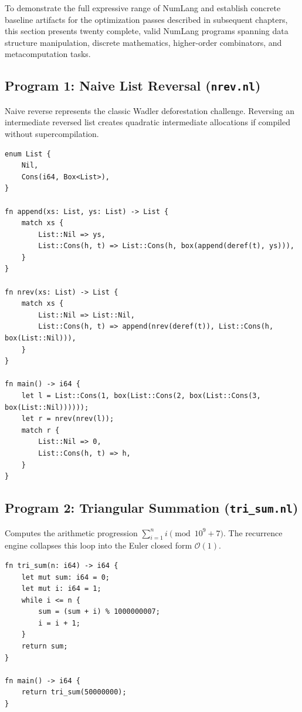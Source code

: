 To demonstrate the full expressive range of NumLang and establish concrete baseline artifacts for the optimization passes described in subsequent chapters, this section presents twenty complete, valid NumLang programs spanning data structure manipulation, discrete mathematics, higher-order combinators, and metacomputation tasks.

\subsection{Program 1: Naive List Reversal (\texttt{nrev.nl})}
Naive reverse represents the classic Wadler deforestation challenge. Reversing an intermediate reversed list creates quadratic intermediate allocations if compiled without supercompilation.

\begin{lstlisting}[language=NumLang, caption={Naive List Reverse in NumLang.}]
enum List {
    Nil,
    Cons(i64, Box<List>),
}

fn append(xs: List, ys: List) -> List {
    match xs {
        List::Nil => ys,
        List::Cons(h, t) => List::Cons(h, box(append(deref(t), ys))),
    }
}

fn nrev(xs: List) -> List {
    match xs {
        List::Nil => List::Nil,
        List::Cons(h, t) => append(nrev(deref(t)), List::Cons(h, box(List::Nil))),
    }
}

fn main() -> i64 {
    let l = List::Cons(1, box(List::Cons(2, box(List::Cons(3, box(List::Nil))))));
    let r = nrev(nrev(l));
    match r {
        List::Nil => 0,
        List::Cons(h, t) => h,
    }
}
\end{lstlisting}

\subsection{Program 2: Triangular Summation (\texttt{tri\_sum.nl})}
Computes the arithmetic progression $\sum_{i=1}^n i \pmod{10^9+7}$. The recurrence engine collapses this loop into the Euler closed form $\mathcal{O}(1)$.

\begin{lstlisting}[language=NumLang, caption={Triangular Summation in NumLang.}]
fn tri_sum(n: i64) -> i64 {
    let mut sum: i64 = 0;
    let mut i: i64 = 1;
    while i <= n {
        sum = (sum + i) % 1000000007;
        i = i + 1;
    }
    return sum;
}

fn main() -> i64 {
    return tri_sum(50000000);
}
\end{lstlisting}

